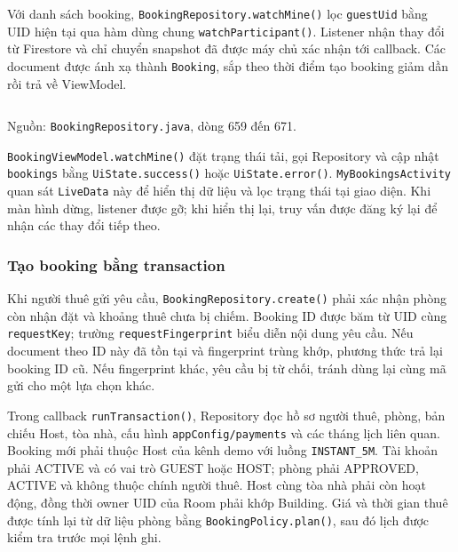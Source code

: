 Với danh sách booking, \texttt{Booking\allowbreak{}Repository.\allowbreak{}watchMine()} lọc \texttt{guest\allowbreak{}Uid} bằng UID hiện tại qua hàm dùng chung \texttt{watch\allowbreak{}Participant()}. Listener nhận thay đổi từ Firestore và chỉ chuyển snapshot đã được máy chủ xác nhận tới callback. Các document được ánh xạ thành \texttt{Booking}, sắp theo thời điểm tạo booking giảm dần rồi trả về ViewModel.

\par\medskip\noindent\begin{minipage}{\linewidth}
\inputminted[firstnumber=1]{java}{Resources/chapter4/code/booking-query-listener.java}
{\footnotesize\noindent Nguồn: \texttt{Booking\allowbreak{}Repository.\allowbreak{}java}, dòng 659 đến 671.\par}
\end{minipage}\par\medskip

\texttt{Booking\allowbreak{}ViewModel.\allowbreak{}watchMine()} đặt trạng thái tải, gọi Repository và cập nhật \texttt{bookings} bằng \texttt{UiState.\allowbreak{}success()} hoặc \texttt{UiState.\allowbreak{}error()}. \texttt{My\allowbreak{}Bookings\allowbreak{}Activity} quan sát \texttt{LiveData} này để hiển thị dữ liệu và lọc trạng thái tại giao diện. Khi màn hình dừng, listener được gỡ; khi hiển thị lại, truy vấn được đăng ký lại để nhận các thay đổi tiếp theo.

\subsubsection{Tạo booking bằng transaction}

Khi người thuê gửi yêu cầu, \texttt{Booking\allowbreak{}Repository.\allowbreak{}create()} phải xác nhận phòng còn nhận đặt và khoảng thuê chưa bị chiếm. Booking ID được băm từ UID cùng \texttt{request\allowbreak{}Key}; trường \texttt{request\allowbreak{}Fingerprint} biểu diễn nội dung yêu cầu. Nếu document theo ID này đã tồn tại và fingerprint trùng khớp, phương thức trả lại booking ID cũ. Nếu fingerprint khác, yêu cầu bị từ chối, tránh dùng lại cùng mã gửi cho một lựa chọn khác.

Trong callback \texttt{run\allowbreak{}Transaction()}, Repository đọc hồ sơ người thuê, phòng, bản chiếu Host, tòa nhà, cấu hình \texttt{appConfig/payments} và các tháng lịch liên quan. Booking mới phải thuộc Host của kênh demo với luồng \texttt{INSTANT\_5M}. Tài khoản phải ACTIVE và có vai trò GUEST hoặc HOST; phòng phải APPROVED, ACTIVE và không thuộc chính người thuê. Host cùng tòa nhà phải còn hoạt động, đồng thời owner UID của Room phải khớp Building. Giá và thời gian thuê được tính lại từ dữ liệu phòng bằng \texttt{Booking\allowbreak{}Policy.\allowbreak{}plan()}, sau đó lịch được kiểm tra trước mọi lệnh ghi.

